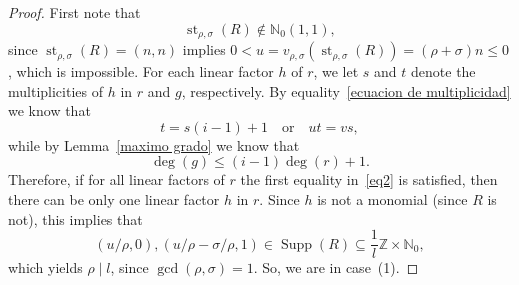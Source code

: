 \documentclass[reqno,a4paper]{amsart}
\theoremstyle{definition}
\theoremstyle{remark}
\DeclareMathOperator{\Supp}{Supp}
\DeclareMathOperator{\st}{st}
\begin{document}
\begin{proof} First note that
\begin{equation}\label{starting R no esta en la diagonal}
  \st_{\rho,\sigma}(R)\notin \mathds{N}_0(1,1),
\end{equation}
since $ \st_{\rho,\sigma}(R)=(n,n)$ implies $0<u=v_{\rho,\sigma}(\st_{\rho,\sigma}(R))=(\rho+\sigma)n\le 0$, which is impossible.
For each linear factor $h$ of $r$, we let $s$ and $t$ denote the multiplicities of $h$ in $r$ and $g$, res\-pectively. By equality~\eqref{ecuacion de multiplicidad} we know that
\begin{equation}\label{eq2}
t=s(i-1)+1\quad\text{or}\quad ut=vs,
\end{equation}
while by Lemma~\ref{maximo grado} we know that
$$
\deg(g)\le (i-1)\deg(r)+1.
$$
Therefore, if for all linear factors of $r$ the first equality in~\eqref{eq2} is satisfied, then there can be only one linear factor $h$ in $r$. Since $h$ is not a monomial (since $R$ is not), this implies that
$$
(u/\rho,0), (u/\rho-\sigma/\rho,1)\in\Supp(R)\subseteq \frac 1l\mathds{Z}\times \mathds{N}_0,
$$
which yields $\rho\mid l$, since $\gcd(\rho,\sigma)=1$. So, we are in case~(1).


\end{proof}
\end{document}
